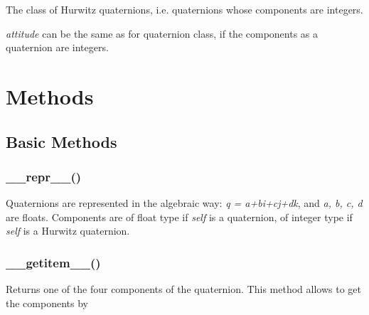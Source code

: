 \documentclass[letterpaper,10pt,english]{sphinxmanual}
\begin{document}
\begin{fulllineitems}
\end{fulllineitems}


The class of Hurwitz quaternions, i.e. quaternions whose components are integers.

\emph{attitude} can be the same as for quaternion class, if the components as a quaternion are integers.


\chapter{Methods}
\label{methods::doc}\label{methods:methods}

\section{Basic Methods}
\label{methods:basic-methods}

\subsection{\_\_repr\_\_()}
\label{methods:repr}

\begin{fulllineitems}
\label{methods:__repr__}
\end{fulllineitems}


Quaternions are represented in the algebraic way: \emph{q = a+bi+cj+dk}, and \emph{a, b, c, d} are floats. Components are of float type if \emph{self} is a quaternion, of integer type if \emph{self} is a Hurwitz quaternion.


\subsection{\_\_getitem\_\_()}
\label{methods:getitem}

\begin{fulllineitems}
\label{methods:__getitem__}
\end{fulllineitems}


Returns one of the four components of the quaternion. This method allows to get the components by

\end{document}
